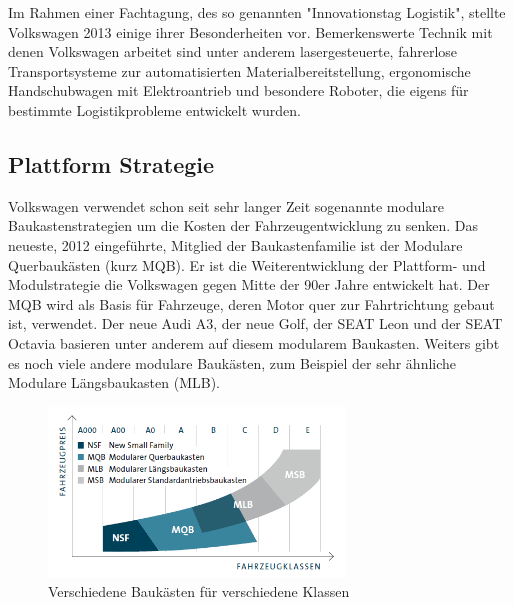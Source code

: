\documentclass[12pt]{article}
\begin{document}
Im Rahmen einer Fachtagung, des so genannten "Innovationstag Logistik", stellte Volkswagen 2013 einige ihrer Besonderheiten vor. Bemerkenswerte Technik mit denen Volkswagen arbeitet sind unter anderem lasergesteuerte, fahrerlose Transportsysteme zur automatisierten Materialbereitstellung, ergonomische Handschubwagen mit Elektroantrieb und besondere Roboter, die eigens für bestimmte Logistikprobleme entwickelt wurden.\cite{wolfsburg}
\subsection{Plattform Strategie}
Volkswagen verwendet schon seit sehr langer Zeit sogenannte modulare Baukastenstrategien um die Kosten der Fahrzeugentwicklung zu senken. Das neueste, 2012 eingeführte, Mitglied der Baukastenfamilie ist der Modulare Querbaukästen (kurz MQB). Er ist die Weiterentwicklung der Plattform- und Modulstrategie die Volkswagen gegen Mitte der 90er Jahre entwickelt hat. Der MQB wird als Basis für Fahrzeuge, deren Motor quer zur Fahrtrichtung gebaut ist, verwendet. Der neue Audi A3, der neue Golf, der SEAT Leon und der SEAT Octavia basieren unter anderem auf diesem modularem Baukasten. Weiters gibt es noch viele andere modulare Baukästen, zum Beispiel der sehr ähnliche Modulare Längsbaukasten (MLB).\cite{mqb}
\FloatBarrier
\begin{figure}[here!]
	\centering
	\includegraphics[width=0.7\textwidth]{images/MQB}
	\caption{Verschiedene Baukästen für verschiedene Klassen \cite{baukastengraph}}
\end{figure}\FloatBarrier\noindent
\end{document}
